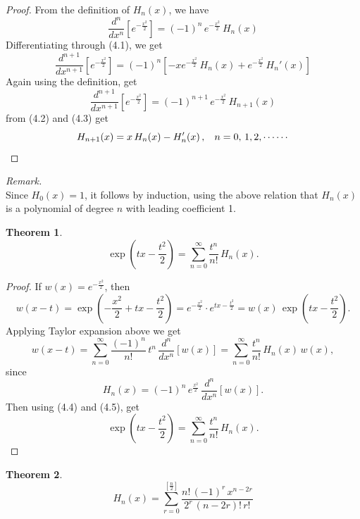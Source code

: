 \documentclass[12pt,a4paper]{report}
\theoremstyle{definition}
\newtheorem{thm}{Theorem}[section]
\theoremstyle{plain}
\begin{document}
\begin{proof}
From the definition of $H_n(x)$, we have
\begin{equation}
\frac{d^n}{dx^n}\left[e^{-\frac{x^2}{2}}\right] = (-1)^n\, e^{-\frac{x^2}{2}}\, H_n(x)
\end{equation}
Differentiating through (4.1), we get
\begin{equation}
\frac{d^{n+1}}{dx^{n+1}}\left[e^{-\frac{x^2}{2}}\right] = (-1)^n\left[-xe^{-\frac{x^2}{2}}\, H_n(x) + e^{-\frac{x^2}{2}}\, H_n'(x)\right]
\end{equation}
Again using the definition, get
\begin{equation}
\frac{d^{n+1}}{dx^{n+1}}\left[e^{-\frac{x^2}{2}}\right] = (-1)^{n+1}\, e^{-\frac{x^2}{2}}\, H_{n+1}(x)
\end{equation}
from (4.2) and (4.3) get
$$H_{n+1}(x) = x\, H_n(x) - H_n'(x)\, , \hspace{0.3cm} n = 0, \, 1, 2, \cdots\cdots$$
\end{proof}


\textit{Remark.}\\
Since $H_0(x) = 1$, it follows by induction, using the above relation that $H_n(x)$ is a polynomial of degree $n$ with leading coefficient 1.



\begin{thm}
$$\exp\left(tx - \frac{t^2}{2}\right) = \sum^{\infty}_{n = 0} \frac{t^n}{n!}\, H_n(x).$$
\end{thm}

\begin{proof}
If $w(x) = e^{-\frac{x^2}{2}}$, then 
\begin{equation}
w(x - t) = \exp\left(-\frac{x^2}{2} + tx - \frac{t^2}{2}\right) = e^{-\frac{x^2}{2}}\cdot e^{tx - \frac{t^2}{2}} = w(x)\, \exp\left(tx - \frac{t^2}{2}\right).
\end{equation}
Applying Taylor expansion above we get 
\begin{equation}
w(x -t) = \sum^{\infty}_{n = 0} \frac{(-1)^n}{n!}\, t^n\, \dfrac{d^n}{dx^n}[w(x)] = \sum_{n = 0}^{\infty} \frac{t^n}{n!}\, H_n(x)\, w(x),
\end{equation}
since 
$$H_n(x) = (-1)^n\, e^{\frac{x^2}{2}}\, \frac{d^n}{dx^n}[w(x)].$$
Then using (4.4) and (4.5), get
$$\exp\left(tx - \frac{t^2}{2}\right) = \sum_{n = 0}^{\infty} \frac{t^n}{n!}\, H_n(x).$$
\end{proof}




\begin{thm}
$$H_n(x) = \sum_{r = 0}^{\left[\frac{n}{2}\right]}\frac{n!\, (-1)^r\, x^{n - 2r}}{2^r\, (n - 2r)!\, r!}$$
\end{thm}
\end{document}
